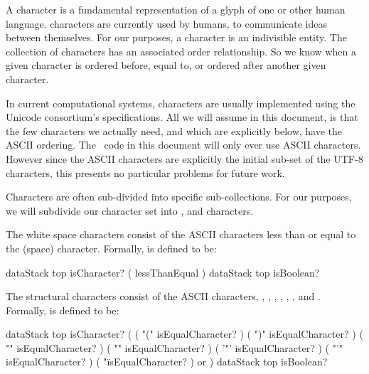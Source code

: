 \subChapterAppendix[title=Characters, reference=characterSpec]

A character is a fundamental representation of a glyph of one or other 
human language.  characters are currently used by humans, 
to communicate ideas between themselves. For our purposes, a character is 
an indivisible entity. The collection of characters has an associated 
order relationship. So we know when a given character is ordered before, 
equal to, or ordered after another given character. 

In current computational systems, characters are usually implemented using 
the Unicode consortium's  specifications. All we will assume 
in this document, is that the few characters we actually need, and which 
are explicitly  below, have the  ASCII 
ordering. The \joylol\ code in this document will only ever use ASCII 
characters. However since the ASCII characters are explicitly the initial 
sub-set of the UTF-8 characters, this presents no particular problems for 
future work. 

Characters are often sub-divided into specific  
sub-collections. For our purposes, we will subdivide our character set 
into ,  and  
characters. 

\startDefinition

The white space characters consist of the ASCII characters less than or 
equal to the \quote{~} (space) character. Formally, 
 is defined to be: 

\starttyping
{ dataStack top isCharacter? }
( \space lessThanEqual )
{ dataStack top isBoolean? }
\stoptyping


The structural characters consist of the ASCII characters, \quote{(}, 
\quote{)}, \quote{\{}, \quote{\}}, , , and 
\quote{\textbackslash}. Formally, 
 is defined to be: 

\starttyping
{ dataStack top isCharacter? }
(
  ( "(" isEqualCharacter? )
  ( ")" isEqualCharacter? )
  ( "{" isEqualCharacter? )
  ( "}" isEqualCharacter? )
  ( '"' isEqualCharacter? )
  ( "'" isEqualCharacter? )
  ( "\" isEqualCharacter? )
  or
)
{ dataStack top isBoolean? }

